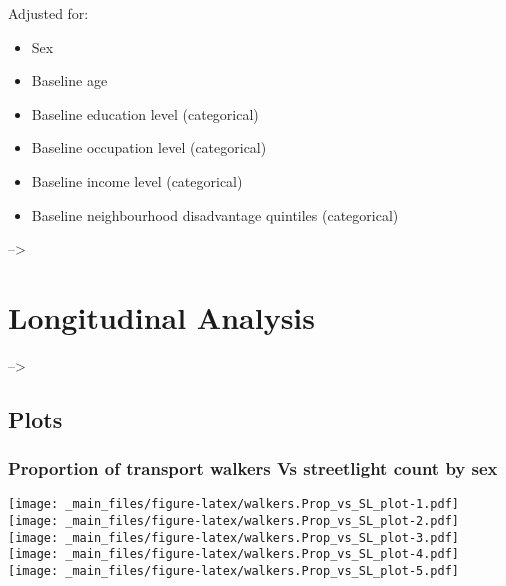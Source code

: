 \documentclass[
]{book}
\providecommand{\tightlist}{%
  \setlength{\itemsep}{0pt}\setlength{\parskip}{0pt}}
\begin{document}
Adjusted for:

\begin{itemize}
\tightlist
\item
  Sex
\item
  Baseline age
\item
  Baseline education level (categorical)
\item
  Baseline occupation level (categorical)
\item
  Baseline income level (categorical)
\item
  Baseline neighbourhood disadvantage quintiles (categorical)
\end{itemize}

--\textgreater{}

\hypertarget{longitudinal-analysis}{%
\chapter{Longitudinal Analysis}\label{longitudinal-analysis}}

--\textgreater{}

\hypertarget{plots}{%
\section{Plots}\label{plots}}

\hypertarget{proportion-of-transport-walkers-vs-streetlight-count-by-sex}{%
\subsection{Proportion of transport walkers Vs streetlight count by sex}\label{proportion-of-transport-walkers-vs-streetlight-count-by-sex}}

\texttt{[image: \_main\_files/figure-latex/walkers.Prop\_vs\_SL\_plot-1.pdf]} \texttt{[image: \_main\_files/figure-latex/walkers.Prop\_vs\_SL\_plot-2.pdf]} \texttt{[image: \_main\_files/figure-latex/walkers.Prop\_vs\_SL\_plot-3.pdf]} \texttt{[image: \_main\_files/figure-latex/walkers.Prop\_vs\_SL\_plot-4.pdf]} \texttt{[image: \_main\_files/figure-latex/walkers.Prop\_vs\_SL\_plot-5.pdf]}

  
\end{document}
